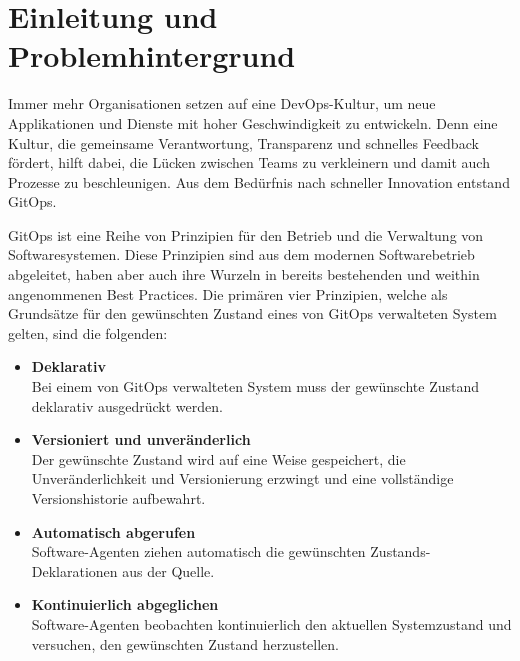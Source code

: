 \chapter{Einleitung und Problemhintergrund}


Immer mehr Organisationen setzen auf 
eine DevOps-Kultur, um neue Applikationen und Dienste mit hoher Geschwindigkeit zu entwickeln. 
Denn eine Kultur, die gemeinsame Verantwortung, Transparenz und schnelles Feedback fördert, 
hilft dabei, die Lücken zwischen Teams zu verkleinern und damit auch Prozesse zu beschleunigen.
Aus dem Bedürfnis nach schneller Innovation entstand GitOps.
\bigskip


\noindent
GitOps ist eine Reihe von Prinzipien für den Betrieb und die Verwaltung von Softwaresystemen.
Diese Prinzipien sind aus dem modernen Softwarebetrieb abgeleitet, haben aber auch ihre Wurzeln 
in bereits bestehenden und weithin angenommenen Best Practices. Die primären vier Prinzipien,
welche als Grundsätze für den gewünschten Zustand eines
von GitOps verwalteten System gelten, sind die folgenden:

\begin{itemize}
	\item \textbf{Deklarativ} \\
		Bei einem von GitOps verwalteten System muss der gewünschte Zustand deklarativ ausgedrückt werden.
	\item \textbf{Versioniert und unveränderlich} \\
		Der gewünschte Zustand wird auf eine Weise gespeichert, die Unveränderlichkeit und Versionierung erzwingt und eine vollständige Versionshistorie aufbewahrt.
	\item \textbf{Automatisch abgerufen} \\
		Software-Agenten ziehen automatisch die gewünschten Zustands-Deklarationen aus der Quelle.
	\item \textbf{Kontinuierlich abgeglichen} \\
		Software-Agenten beobachten kontinuierlich den aktuellen Systemzustand und versuchen, den gewünschten Zustand herzustellen.
\end{itemize}

\noindent
\autocite{gitopsPrinciplesv100}
\bigskip

